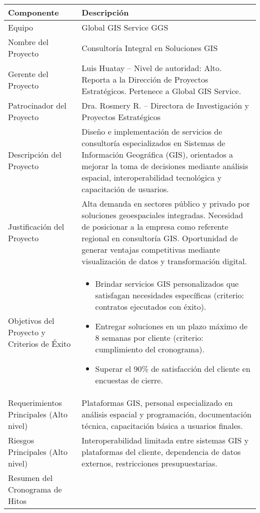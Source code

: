 \begin{table}[H]
\centering
\renewcommand{\arraystretch}{1.4}
\begin{tabular}{|p{5cm}|p{10cm}|}
\hline
\textbf{Componente} & \textbf{Descripción} \\
\hline
Equipo & Global GIS Service GGS \\
\hline
Nombre del Proyecto & Consultoría Integral en Soluciones GIS \\
\hline
Gerente del Proyecto & Luis Huatay – Nivel de autoridad: Alto. Reporta a la Dirección de Proyectos Estratégicos. Pertenece a Global GIS Service. \\
\hline
Patrocinador del Proyecto & Dra. Rosmery R. – Directora de Investigación y Proyectos Estratégicos \\
\hline
Descripción del Proyecto & Diseño e implementación de servicios de consultoría especializados en Sistemas de Información Geográfica (GIS), orientados a mejorar la toma de decisiones mediante análisis espacial, interoperabilidad tecnológica y capacitación de usuarios. \\
\hline
Justificación del Proyecto & Alta demanda en sectores público y privado por soluciones geoespaciales integradas. Necesidad de posicionar a la empresa como referente regional en consultoría GIS. Oportunidad de generar ventajas competitivas mediante visualización de datos y transformación digital. \\
\hline
Objetivos del Proyecto y Criterios de Éxito & 
\begin{itemize}
    \item Brindar servicios GIS personalizados que satisfagan necesidades específicas (criterio: contratos ejecutados con éxito).
    \item Entregar soluciones en un plazo máximo de 8 semanas por cliente (criterio: cumplimiento del cronograma).
    \item Superar el 90\% de satisfacción del cliente en encuestas de cierre.
\end{itemize} \\
\hline
Requerimientos Principales (Alto nivel) & Plataformas GIS, personal especializado en análisis espacial y programación, documentación técnica, capacitación básica a usuarios finales. \\
\hline
Riesgos Principales (Alto nivel) & Interoperabilidad limitada entre sistemas GIS y plataformas del cliente, dependencia de datos externos, restricciones presupuestarias. \\
\hline
Resumen del Cronograma de Hitos & 

\end{tabular}
\end{table}
